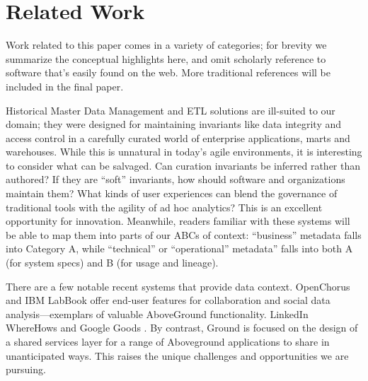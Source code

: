 \documentclass{sig-alternate}
\begin{document}



\section{Related Work}
\label{sec:relwork}
Work related to this paper comes in a variety of categories; for brevity we summarize the conceptual highlights here, and omit scholarly reference to software that's easily found on the web. More traditional references will be included in the final paper. 

Historical Master Data Management and ETL solutions are ill-suited to our domain; they were designed for maintaining invariants like data integrity and access control in a carefully curated world of enterprise applications, marts and warehouses. While this is unnatural in today's agile environments, it is interesting to consider what can be salvaged. Can curation invariants be inferred rather than authored? If they are ``soft'' invariants, how should software and organizations maintain them? What kinds of user experiences can blend the governance of traditional tools with the agility of ad hoc analytics?  This is an excellent opportunity for innovation. Meanwhile, readers familiar with these systems will be able to map them into parts of our ABCs of context: ``business'' metadata falls into Category A, while ``technical'' or ``operational'' metadata'' falls into both A (for system specs) and B (for usage and lineage).

There are a few notable recent systems that provide data context. OpenChorus and IBM LabBook offer end-user features for collaboration and social data analysis---exemplars of valuable AboveGround functionality.
LinkedIn WhereHows and Google Goods .  By contrast, Ground is focused on the design of a shared services layer for a range of Aboveground applications to share in unanticipated ways. This raises the unique challenges and opportunities we are pursuing.
\end{document}
